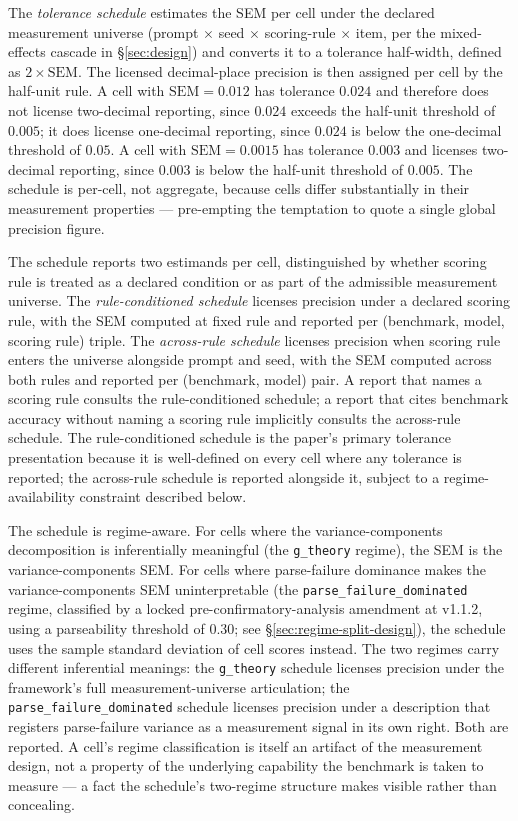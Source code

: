 \documentclass[11pt]{article}
\begin{document}
The \emph{tolerance schedule} estimates the
SEM per cell under the declared measurement universe (prompt
$\times$ seed $\times$ scoring-rule $\times$ item, per the
mixed-effects cascade in §\ref{sec:design}) and converts it to a
tolerance half-width, defined as $2 \times \mathrm{SEM}$. The
licensed decimal-place precision is then assigned per cell by the
half-unit rule. A cell with $\mathrm{SEM} = 0.012$ has tolerance
$0.024$ and therefore does not license two-decimal reporting,
since $0.024$ exceeds the half-unit threshold of $0.005$; it does
license one-decimal reporting, since $0.024$ is below the
one-decimal threshold of $0.05$. A cell with $\mathrm{SEM} =
0.0015$ has tolerance $0.003$ and licenses two-decimal reporting,
since $0.003$ is below the half-unit threshold of $0.005$. The
schedule is per-cell, not aggregate, because cells differ
substantially in their measurement properties --- pre-empting the
temptation to quote a single global precision figure.

The schedule reports two estimands per cell, distinguished by whether
scoring rule is treated as a declared condition or as part of the admissible
measurement universe. The \emph{rule-conditioned schedule} licenses precision
under a declared scoring rule, with the SEM computed at fixed rule and
reported per (benchmark, model, scoring rule) triple. The \emph{across-rule
schedule} licenses precision when scoring rule enters the universe alongside
prompt and seed, with the SEM computed across both rules and reported per
(benchmark, model) pair. A report that names a scoring rule consults the
rule-conditioned schedule; a report that cites benchmark accuracy without
naming a scoring rule implicitly consults the across-rule schedule. The
rule-conditioned schedule is the paper's primary tolerance presentation
because it is well-defined on every cell where any tolerance is reported;
the across-rule schedule is reported alongside it, subject to a
regime-availability constraint described below.

The schedule is regime-aware. For cells where the variance-components
decomposition is inferentially meaningful (the \texttt{g\_theory}
regime), the SEM is the variance-components SEM. For cells where
parse-failure dominance makes the variance-components SEM
uninterpretable (the \texttt{parse\_failure\_dominated} regime,
classified by a locked pre-confirmatory-analysis amendment at v1.1.2,
using a parseability threshold of $0.30$; see
§\ref{sec:regime-split-design}),
the schedule uses the sample standard deviation of cell scores
instead. The two regimes carry different inferential meanings: the
\texttt{g\_theory} schedule licenses precision under the framework's
full measurement-universe articulation; the
\texttt{parse\_failure\_dominated} schedule licenses precision under
a description that registers parse-failure variance as a measurement
signal in its own right. Both are reported. A cell's regime
classification is itself an artifact of the measurement design, not
a property of the underlying capability the benchmark is taken to
measure --- a fact the schedule's two-regime structure makes visible
rather than concealing.
\end{document}
